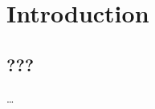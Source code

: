 \chapter{Introduction}
\label{chapter:introduction}

\setcounter{page}{1}


\section{???}
\label{sec:???}
%
\dots




